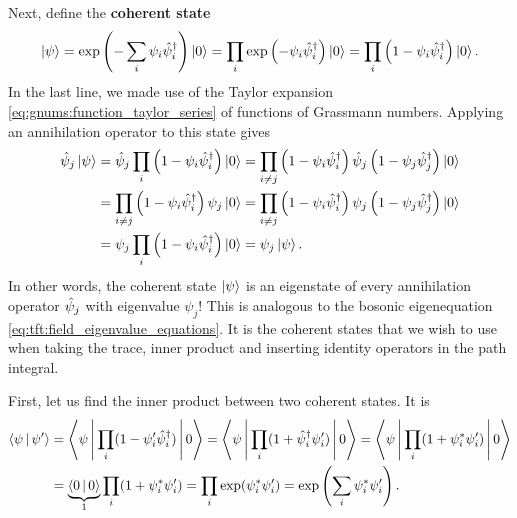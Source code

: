 Next, define the \textbf{coherent state}
\begin{equation}
	\ket{\psi} = \exp \left( -\sum_i \psi_i \hat\psi^\dagger_i \right) \ket{0} = \prod_i \exp \left( -\psi_i \hat\psi^\dagger_i \right) \ket{0} = \prod_i \left( 1 - \psi_i \hat\psi^\dagger_i \right) \ket{0} .
\end{equation}
In the last line, we made use of the Taylor expansion \eqref{eq:gnums:function_taylor_series} of functions of Grassmann numbers.
Applying an annihilation operator to this state gives
\begin{equation}
\begin{aligned}
	\hat\psi_j \ket{\psi} &= \hat\psi_j \prod_i \left( 1 - \psi_i \hat\psi^\dagger_i \right) \ket{0} = \prod_{i \neq j} \left( 1 - \psi_i \hat\psi^\dagger_i \right) \hat\psi_j \left( 1 - \psi_j \hat\psi^\dagger_j \right) \ket{0} \\
	                    &= \prod_{i \neq j} \left( 1 - \psi_i \hat\psi^\dagger_i \right) \psi_j \ket{0} = \prod_{i \neq j} \left( 1 - \psi_i \hat\psi^\dagger_i \right) \psi_j \left( 1 - \psi_j \hat\psi^\dagger_j \right) \ket{0}   \\
	                    &= \psi_j \prod_i \left( 1 - \psi_i \hat\psi^\dagger_i \right) \ket{0} = \psi_j \ket{\psi} . \\
\end{aligned}
\end{equation}
In other words, the coherent state $\ket{\psi}$ is an eigenstate of every annihilation operator $\hat\psi_j$ with eigenvalue $\psi_j$!
This is analogous to the bosonic eigenequation  \eqref{eq:tft:field_eigenvalue_equations}.
It is the coherent states that we wish to use when taking the trace, inner product and inserting identity operators in the path integral.

First, let us find the inner product between two coherent states.
It is
\begin{equation}
\begin{split}
	\iffalse
	\braket{\psi | \psi'} &= \braket{0 | \prod_i (1 - \destr_i \conj\psi_i) \prod_j (1 - \psi'_j \creat_j) | 0} \\
	                      &= \braket{0 | 0} + \sum_{i,j} \braket{0 | \destr_i \conj\psi_i \psi'_j \creat_j | 0}
	                       = \braket{0 | 0} + \sum_{i,j} \conj\psi_i \psi'_j \braket{0 | \destr_i \creat_j | 0} \\
	                      &= \braket{0 | 0} + \sum_{i  } \conj\psi_i \psi'_i
						   = 1 + \sum_i \conj\psi_i \psi'_i = \exp \left( \sum_i \conj\psi_i \psi'_i \right) .
	\fi
	\Braket{\psi | \psi'} &= \Braket{\psi | \prod_i (1 - \psi'_i \creat_i) | 0} = \Braket{\psi | \prod_i (1 + \creat_i \psi'_i) | 0} = \Braket{\psi | \prod_i (1 + \conj\psi_i \psi'_i) | 0} \\
						  &= \underbrace{\Braket{0 | 0}}_{1} \prod_i (1 + \conj\psi_i \psi'_i) = \prod_i \exp(\conj\psi_i \psi'_i) = \exp \left( \sum_i \conj\psi_i \psi'_i \right) .
\end{split}
\label{eq:tft:grassmann_inner_product_discrete}
\end{equation}


